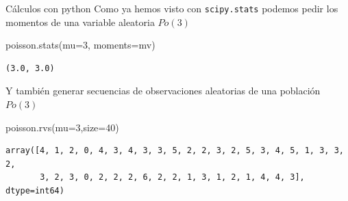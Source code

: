 \documentclass[
  ignorenonframetext,
  aspectratio=169]{beamer}
\newenvironment{Shaded}{\begin{snugshade}}{\end{snugshade}}
\newcommand{\DecValTok}[1]{\textcolor[rgb]{0.68,0.00,0.00}{#1}}
\newcommand{\NormalTok}[1]{\textcolor[rgb]{0.00,0.23,0.31}{#1}}
\newcommand{\OperatorTok}[1]{\textcolor[rgb]{0.37,0.37,0.37}{#1}}
\newcommand{\StringTok}[1]{\textcolor[rgb]{0.13,0.47,0.30}{#1}}
\begin{document}
\begin{frame}[fragile]{Cálculos con python}
\protect\hypertarget{cuxe1lculos-con-python-9}{}
Como ya hemos visto con \texttt{scipy.stats} podemos pedir los momentos
de una variable aleatoria \(Po(3)\)

\begin{Shaded}
\begin{Highlighting}[]
\NormalTok{poisson.stats(mu}\OperatorTok{=}\DecValTok{3}\NormalTok{, moments}\OperatorTok{=}\StringTok{\textquotesingle{}mv\textquotesingle{}}\NormalTok{)}
\end{Highlighting}
\end{Shaded}

\begin{verbatim}
(3.0, 3.0)
\end{verbatim}

Y también generar secuencias de observaciones aleatorias de una
población \(Po(3)\)

\begin{Shaded}
\begin{Highlighting}[]
\NormalTok{poisson.rvs(mu}\OperatorTok{=}\DecValTok{3}\NormalTok{,size}\OperatorTok{=}\DecValTok{40}\NormalTok{)}
\end{Highlighting}
\end{Shaded}

\begin{verbatim}
array([4, 1, 2, 0, 4, 3, 4, 3, 3, 5, 2, 2, 3, 2, 5, 3, 4, 5, 1, 3, 3, 2,
       3, 2, 3, 0, 2, 2, 2, 6, 2, 2, 1, 3, 1, 2, 1, 4, 4, 3], dtype=int64)
\end{verbatim}
\end{frame}
\end{document}
